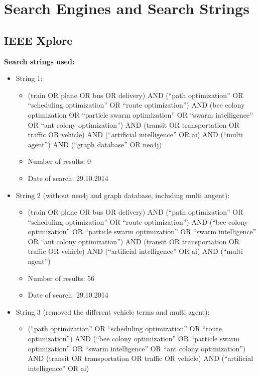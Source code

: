 \chapter{Search Engines and Search Strings}



\section{IEEE Xplore}

\textbf{Search strings used:}
\begin{itemize}
\item String 1:
\begin{itemize}
\item (train OR plane OR bus OR delivery) AND (``path optimization'' OR ``scheduling optimization'' OR ``route optimization'') AND (bee colony optimization OR ``particle swarm optimization'' OR ``swarm intelligence'' OR ``ant colony optimization'') AND (transit OR transportation OR traffic OR vehicle) AND (``artificial intelligence'' OR ai) AND (``multi agent'') AND (``graph database'' OR neo4j)
\item Number of results: 0
\item Date of search: 29.10.2014
\end{itemize}
\item String 2 (without neo4j and graph database, including multi angent):
\begin{itemize}
\item (train OR plane OR bus OR delivery) AND (``path optimization'' OR ``scheduling optimization'' OR ``route optimization'') AND (``bee colony optimization'' OR ``particle swarm optimization'' OR ``swarm intelligence'' OR ``ant colony optimization'') AND (transit OR transportation OR traffic OR vehicle) AND (``artificial intelligence'' OR ai) AND (``multi agent'') 
\item Number of results: 56
\item Date of search: 29.10.2014
\end{itemize}
\item String 3 (removed the different vehicle terms and multi agent):
\begin{itemize}
\item (``path optimization'' OR ``scheduling optimization'' OR ``route optimization'') AND (``bee colony optimization'' OR ``particle swarm optimization'' OR ``swarm intelligence'' OR ``ant colony optimization'') AND (transit OR transportation OR traffic OR vehicle) AND (``artificial intelligence'' OR ai) 

\end{itemize}
\end{itemize}
